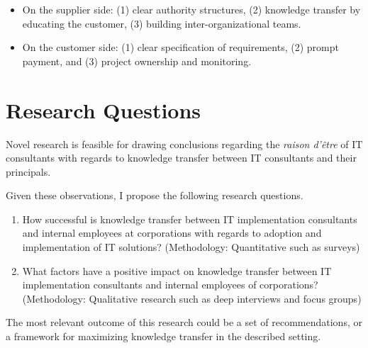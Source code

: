 \documentclass[12pt]{article}
\providecommand{\tightlist}{%
  \setlength{\itemsep}{0pt}\setlength{\parskip}{0pt}}
\begin{document}
\begin{itemize}
\tightlist
\item
  On the supplier side: (1) clear authority structures, (2) knowledge
  transfer by educating the customer, (3) building inter-organizational
  teams.
\item
  On the customer side: (1) clear specification of requirements, (2)
  prompt payment, and (3) project ownership and monitoring.
\end{itemize}

\hypertarget{research-questions}{%
\section{Research Questions}\label{research-questions}}

Novel research is feasible for drawing conclusions regarding the
\emph{raison d'être} of IT consultants with regards to knowledge
transfer between IT consultants and their principals.

Given these observations, I propose the following research questions.

\begin{enumerate}
\def\labelenumi{\arabic{enumi}.}
\item
  How successful is knowledge transfer between IT implementation
  consultants and internal employees at corporations with regards to
  adoption and implementation of IT solutions? (Methodology:
  Quantitative such as surveys)
\item
  What factors have a positive impact on knowledge transfer between IT
  implementation consultants and internal employees of corporations?
  (Methodology: Qualitative research such as deep interviews and focus
  groups)
\end{enumerate}

The most relevant outcome of this research could be a set of
recommendations, or a framework for maximizing knowledge transfer in the
described setting.



\end{document}
